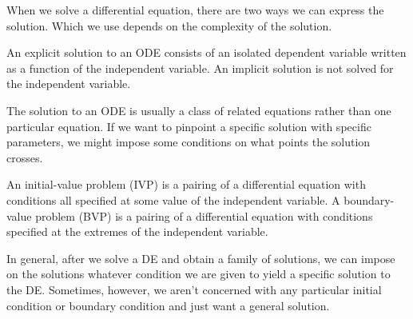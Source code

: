 \documentclass[../m082main.tex]{subfiles}
\begin{document}
When we solve a differential equation, there are two ways we can express the solution.
Which we use depends on the complexity of the solution.

\begin{definition}
    An explicit solution to an ODE consists of an isolated dependent variable written as a function of the independent variable.
    An implicit solution is not solved for the independent variable.
\end{definition}

The solution to an ODE is usually a class of related equations rather than one particular equation.
If we want to pinpoint a specific solution with specific parameters, we might impose some conditions on what points the solution crosses.

\begin{definition}
    An initial-value problem (IVP) is a pairing of a differential equation with conditions all specified at some value of the independent variable.
    A boundary-value problem (BVP) is a pairing of a differential equation with conditions specified at the extremes of the independent variable.
\end{definition}

In general, after we solve a DE and obtain a family of solutions, we can impose on the solutions whatever condition we are given to yield a specific solution to the DE.
Sometimes, however, we aren't concerned with any particular initial condition or boundary condition and just want a general solution.
\end{document}
